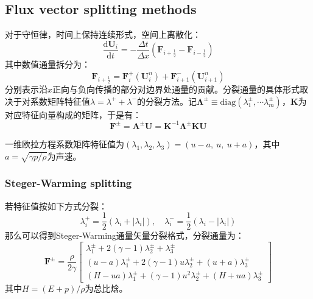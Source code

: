 \documentclass[11pt]{article}
\begin{document}
\subsection{Flux vector splitting methods}
对于守恒律，时间上保持连续形式，空间上离散化：
\begin{equation}
	\frac{\mathrm{d}\bm{U}_i}{\mathrm{d}t}=-\frac{\Delta t}{\Delta x}\left(\bm{F}_{i+\frac{1}{2}}-\bm{F}_{i-\frac{1}{2}}\right)
\end{equation}
其中数值通量拆分为：
\begin{equation}
	\bm{F}_{i+\frac{1}{2}}=\bm{F}_i^+(\bm{U}_i^n)+\bm{F}_{i+1}^-(\bm{U}_{i+1}^n)
\end{equation}
分别表示沿$x$正向与负向传播的部分对边界处通量的贡献。分裂通量的具体形式取决于对系数矩阵特征值$\lambda=\lambda^++\lambda^-$的分裂方法。记$\bm{\Lambda}^{\pm}\equiv\mathrm{diag}\left(\lambda_1^\pm,\cdots \lambda_m^\pm\right)$，$\bm{K}$为对应特征向量构成的矩阵，于是有：
\begin{equation}
	\bm{F}^\pm=\bm{A}^\pm\bm{U}=\bm{K}^{-1}\bm{\Lambda}^\pm\bm{K}\bm{U}
\end{equation}

一维欧拉方程系数矩阵特征值为$(\lambda_1,\lambda_2,\lambda_3)=(u-a,\ u,\ u+a)$，其中$a=\sqrt{\gamma p/\rho}$为声速。

\subsubsection{Steger-Warming splitting}
若特征值按如下方式分裂：
\begin{equation}
	\lambda_i^+=\frac{1}{2}(\lambda_i+|\lambda_i|),\quad\lambda_i^-=\frac{1}{2}(\lambda_i-|\lambda_i|)
\end{equation}
那么可以得到Steger-Warming通量矢量分裂格式，分裂通量为：
\begin{equation}
	\bm{F}^\pm=\frac{\rho}{2\gamma}\left[\begin{matrix}
			\lambda_1^\pm+2(\gamma-1)\lambda_2^\pm+\lambda_3^\pm            \\
			(u-a)\lambda_1^\pm+2(\gamma-1)u\lambda_2^\pm+(u+a)\lambda_3^\pm \\
			(H-ua)\lambda_1^\pm+(\gamma-1)u^2\lambda_2^\pm+(H+ua)\lambda_3^\pm
		\end{matrix}\right]
\end{equation}
其中$H=(E+p)/\rho$为总比焓。
\end{document}
